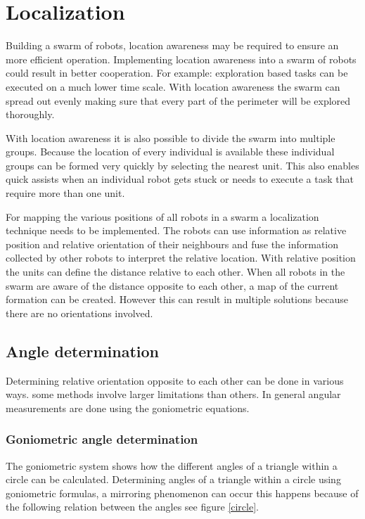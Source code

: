 \documentclass[10pt,a4paper]{article}
\begin{document}
\newpage
\section{Localization}
Building a swarm of robots, location awareness may be required to ensure an more efficient operation. Implementing location awareness into a swarm of robots could result in better cooperation. For example: exploration based tasks can be executed on a much lower time scale. With location awareness the swarm can spread out evenly making sure that every part of the perimeter will be explored thoroughly. 

With location awareness it is also possible to divide the swarm into multiple groups. Because the location of every individual is available these individual groups can be formed very quickly by selecting the nearest unit. This also enables quick assists when an individual robot gets stuck or needs to execute a task that require more than one unit.

For mapping the various positions of all robots in a swarm a localization technique needs to be implemented. The robots can use information as relative position and relative orientation of their neighbours and fuse the information collected by other robots to interpret the relative location. With relative position the units can define the distance relative to each other. When all robots in the swarm are aware of the distance opposite to each other, a map of the current formation can be created. However this can result in multiple solutions because there are no orientations involved. 

\subsection{Angle determination}
Determining relative orientation opposite to each other can be done in various ways. some methods involve larger limitations than others. In general angular measurements are done using the goniometric equations.

\subsubsection{Goniometric angle determination}
The goniometric system shows how the different angles of a triangle within a circle can be calculated. Determining angles of a triangle within a circle using goniometric formulas, a mirroring phenomenon can occur this happens because of the following relation between the angles see figure \ref{circle}.
\end{document}
